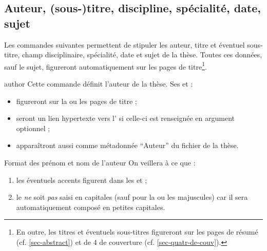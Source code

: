 \subsection{Auteur, (sous-)titre, discipline, spécialité,
  date, sujet}\label{sec-caracteristiques}

Les commandes suivantes permettent de stipuler les auteur, titre et éventuel
sous-titre, champ disciplinaire, spécialité, date et sujet de la thèse. Toutes
ces données, sauf le sujet, figureront automatiquement sur les pages de
titre\footnote{En outre, les titres et éventuels sous-titres figureront sur les
  pages de résumé (cf. \vref{sec-abstract}) et de 4\ieme{} de couverture (cf.
  \vref{sec-quatr-de-couv}).}.
%
\begin{docCommand}[doc description=\mandatory]{author}{}%
  Cette commande définit l'auteur de la thèse. Ses  et
   :
  \begin{itemize}
  \item figureront sur la ou les pages de titre ;
  \item%
    seront un lien hypertexte vers l' si celle-ci est
    renseignée en argument optionnel ;
  \item apparaîtront aussi comme métadonnée \enquote{Auteur} du
    fichier \pdf{} de la thèse.
  \end{itemize}
  \begin{dbwarning}{Format des prénom et nom de l'auteur}{}
    On veillera à ce que :
    \begin{enumerate}
    \item les éventuels accents figurent dans les  et
      ;
    \item {}%
      le  \emph{ne} soit \emph{pas} saisi en capitales (sauf pour la
      ou les majuscules) car il sera automatiquement composé en petites
      capitales.
    \end{enumerate}
  \end{dbwarning}
\end{docCommand}
